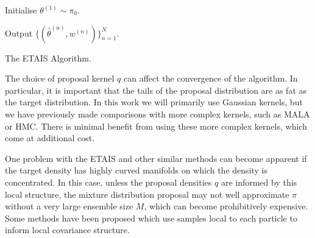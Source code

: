 \documentclass[final]{siamltex}
\newcommand{\edit}[1]{{\color{red} #1}}  %
\providecommand{\DIFaddbegin}{} %
\providecommand{\DIFaddend}{} %
\providecommand{\DIFaddbeginFL}{} %
\providecommand{\DIFaddendFL}{} %
\providecommand{\DIFdelbeginFL}{} %
\providecommand{\DIFdelendFL}{} %
\newcommand{\DIFscaledelfig}{0.5}
\newlength{\DIFdelgraphicswidth} %
\newlength{\DIFdelgraphicsheight} %
\newcommand{\DIFaddincludegraphics}[2][]{{\color{blue}\fbox{\DIFOincludegraphics[#1]{#2}}}} %
\newcommand{\DIFdelincludegraphics}[2][]{%
\sbox{\DIFdelgraphicsbox}{\DIFOincludegraphics[#1]{#2}}%
\settoboxwidth{\DIFdelgraphicswidth}{\DIFdelgraphicsbox} %
\settoboxtotalheight{\DIFdelgraphicsheight}{\DIFdelgraphicsbox} %
\scalebox{\DIFscaledelfig}{%
\parbox[b]{\DIFdelgraphicswidth}{\usebox{\DIFdelgraphicsbox}\\[-\baselineskip] \rule{\DIFdelgraphicswidth}{0em}}\llap{\resizebox{\DIFdelgraphicswidth}{\DIFdelgraphicsheight}{%
\setlength{\unitlength}{\DIFdelgraphicswidth}%
\begin{picture}(1,1)%
\thicklines\linethickness{2pt} %
{\color[rgb]{1,0,0}\put(0,0){\framebox(1,1){}}}%
{\color[rgb]{1,0,0}\put(0,0){\line( 1,1){1}}}%
{\color[rgb]{1,0,0}\put(0,1){\line(1,-1){1}}}%
\end{picture}%
}\hspace*{3pt}}} %
} %
\DeclareRobustCommand{\DIFaddbegin}{\DIFOaddbegin \let\includegraphics\DIFaddincludegraphics} %
\DeclareRobustCommand{\DIFaddend}{\DIFOaddend \let\includegraphics\DIFOincludegraphics} %
\DeclareRobustCommand{\DIFaddbeginFL}{\DIFOaddbeginFL \let\includegraphics\DIFaddincludegraphics} %
\DeclareRobustCommand{\DIFaddendFL}{\DIFOaddendFL \let\includegraphics\DIFOincludegraphics} %
\DeclareRobustCommand{\DIFdelbeginFL}{\DIFOdelbeginFL \let\includegraphics\DIFdelincludegraphics} %
\DeclareRobustCommand{\DIFdelendFL}{\DIFOaddendFL \let\includegraphics\DIFOincludegraphics} %
\begin{document}
\begin{table}[!h]
\centering
\begin{algorithm}[H]
\DontPrintSemicolon
\BlankLine
	Initialise $\theta^{(1)} \sim \pi_0$.\;
	\DIFdelbeginFL %

\DIFdelendFL \DIFaddbeginFL {}
	\DIFaddendFL Output $\{(\hat{\theta}^{(n)},w^{(n)})\}_{n=1}^N$.
\caption{The ETAIS Algorithm.\label{alg:ETAIS}}
\end{algorithm}
\end{table}

\DIFaddbegin \edit{The choice of proposal kernel $q$ can affect the convergence of
  the algorithm. In particular, it is important that the tails of the
  proposal distribution are as fat as the target distribution. In this
  work we will primarily use Gaussian kernels, but we have previously
  made comparisons with more complex kernels, such as MALA or
  HMC\cite{cotter2015parallel,russ2017parallel}. There is minimal
  benefit from using these more complex kernels, which come at
  additional cost.}



\DIFaddend One problem with the ETAIS and other similar methods can become apparent if
the target density has highly curved manifolds on which the density is
concentrated. In this
case, unless the proposal densities $q$ are informed by this local
structure, the mixture distribution proposal may not well approximate
$\pi$ without a very large ensemble size $M$, which can become
prohibitively expensive. Some methods have been
proposed\cite{douc2007minimum}
which use samples local to each particle to inform local covariance
structure.
\end{document}
